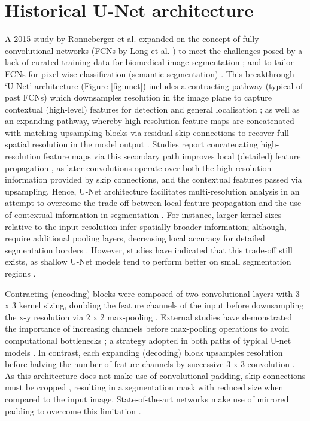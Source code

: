 \section{Historical U-Net architecture}
A 2015 study by Ronneberger et al. expanded on the concept of fully convolutional networks (FCNs by Long et al. \cite{Long2014}) to meet the challenges posed by a lack of curated training data for biomedical image segmentation \cite{Ronneberger_2015}; and to tailor FCNs for pixel-wise classification (semantic segmentation) \cite{DLINMI2018}. This breakthrough `U-Net' architecture (Figure \ref{fig:unet}) includes a contracting pathway (typical of past FCNs) which downsamples resolution in the image plane to capture contextual (high-level) features for detection and general localisation \cite{Nemoto_2020}; as well as an expanding pathway, whereby high-resolution feature maps are  concatenated with matching upsampling blocks via residual skip connections \cite{Maier2019} to recover full spatial resolution in the model output \cite{DLINMI2018}. Studies report concatenating high-resolution feature maps via this secondary path improves local (detailed) feature propagation \cite{Nemoto_2020}, as later convolutions operate over both the high-resolution information provided by skip connections, and the contextual features passed via upsampling. Hence, U-Net architecture facilitates multi-resolution analysis \cite{Maier2019} in an attempt to overcome the trade-off between local feature propagation and the use of contextual information in segmentation \cite{Hesamian2019}. For instance, larger kernel sizes relative to the input resolution infer spatially broader information; although, require additional pooling layers, decreasing local accuracy for detailed segmentation borders \cite{Hesamian2019}. However, studies have indicated that this trade-off still exists, as shallow U-Net models tend to perform better on small segmentation regions \cite{Zhu_2018}.

Contracting (encoding) blocks were composed of two convolutional layers with 3 x 3 kernel sizing, doubling the feature channels of the input before downsampling the x-y resolution via 2 x 2 max-pooling \cite{Ronneberger_2015}. External studies have demonstrated the importance of increasing channels before max-pooling operations to avoid computational bottlenecks \cite{szegedy2015}; a strategy adopted in both paths of typical U-net models \cite{szegedy2015}. In contrast, each expanding (decoding) block upsamples resolution before halving the number of feature channels by successive  3 x 3 convolution \cite{Ronneberger_2015}. As this architecture does not make use of convolutional padding, skip connections must be cropped \cite{Ronneberger_2015}, resulting in a segmentation mask with reduced size when compared to the input image. State-of-the-art networks make use of mirrored padding to overcome this limitation \cite{Nikolov_2018}.

